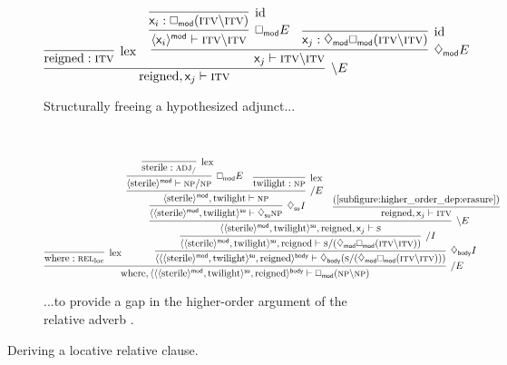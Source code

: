 \begin{figure}
	\begin{subfigure}{1\textwidth}
		\smaller
		\[
			\infer[\divleft E]{\w{reigned}, \varj \vdash \gtype{itv}}{
				\infer[\Lex]{\w{reigned} : \gtype{itv}}{}
				&
				\infer[\ddia{mod}E]{\varj \vdash \gtype{itv}\divleft\gtype{itv}}{
					\infer[\dbox{mod}E]{\dbra{\vari}{mod} \vdash \gtype{itv}\divleft\gtype{itv}}{
						\infer[\Ax]{\vari : \dbox{mod}(\gtype{itv}\divleft\gtype{itv})}{}
					}
					&
					\infer[\Ax]{\varj : \ddia{mod}\dbox{mod}(\gtype{itv}\divleft\gtype{itv})}{}
				}
			}
		\]
		\caption{Structurally freeing a hypothesized adjunct...}	
		\label{subfigure:higher_order_dep:erasure}
	\end{subfigure}\\[\midsep]
	\begin{subfigure}{1\textwidth}
		\smaller
		\[
			\infer[\divright E]{\w{where}, \dbra{\dbra{\dbra{\w{sterile}}{mod}, \w{twilight}}{su}, \w{reigned}}{body} \vdash \dbox{mod}(\np\divleft\np)}{
 				\infer[\Lex]{\w{where} : \subcat{l}{rel}{loc}}{}
				&
				\hspace{-5pt}
				\infer[\ddia{body}I]{\dbra{\dbra{\dbra{\w{sterile}}{mod}, \w{twilight}}{su}, \w{reigned}}{body} \vdash \ddia{body}(\s\divright(\ddia{mod}\dbox{mod}(\gtype{itv}\divleft\gtype{itv})))}{
					\infer[\divright I]{\dbra{\dbra{\w{sterile}}{mod}, \w{twilight}}{su}, \w{reigned} \vdash \s\divright(\ddia{mod}\dbox{mod}(\gtype{itv}\divleft\gtype{itv}))}{
						\infer[\divleft E]{\dbra{\dbra{\w{sterile}}{mod}, \w{twilight}}{su}, \w{reigned}, \varj \vdash \s}{
							\infer[\ddia{su}I]{\dbra{\dbra{\w{sterile}}{mod}, \w{twilight}}{su} \vdash \ddia{su}\np}{
								\infer[\divright E]{\dbra{\w{sterile}}{mod}, \w{twilight} \vdash \np}{
									\infer[\dbox{mod}E]{\dbra{\w{sterile}}{mod} \vdash \np\divright\np}{
										\infer[\Lex]{\w{sterile} : \gtype{adj}_{\divright}}{}
									}
									&
									\infer[\Lex]{\w{twilight}: \np}{}
								}
							}
							&
							\infer{\w{reigned}, \varj \vdash \gtype{itv}}{\text{(\ref{subfigure:higher_order_dep:erasure})}}
						}
					}
				}
			}
		\]
		\caption{...to provide a gap in the higher-order argument of the relative adverb .}
		\label{subfigure:higher_order_dep:rc}
	\end{subfigure}
	\caption{Deriving a locative relative clause.}
	\label{figure:higher_order_dep}
\end{figure}

